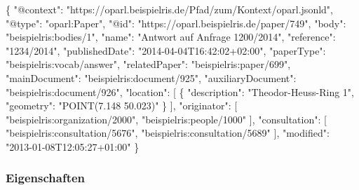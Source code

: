 \documentclass[,a4paper]{article}
\newenvironment{Shaded}{}{}
\newcommand{\DataTypeTok}[1]{\textcolor[rgb]{0.56,0.13,0.00}{{#1}}}
\newcommand{\StringTok}[1]{\textcolor[rgb]{0.25,0.44,0.63}{{#1}}}
\newcommand{\OtherTok}[1]{\textcolor[rgb]{0.00,0.44,0.13}{{#1}}}
\newcommand{\FunctionTok}[1]{\textcolor[rgb]{0.02,0.16,0.49}{{#1}}}
\begin{document}
\begin{Shaded}
\begin{Highlighting}[]
\FunctionTok{\{}
    \DataTypeTok{"@context"}\FunctionTok{:} \StringTok{"https://oparl.beispielris.de/Pfad/zum/Kontext/oparl.jsonld"}\FunctionTok{,}
    \DataTypeTok{"@type"}\FunctionTok{:} \StringTok{"oparl:Paper"}\FunctionTok{,}
    \DataTypeTok{"@id"}\FunctionTok{:} \StringTok{"https://oparl.beispielris.de/paper/749"}\FunctionTok{,}
    \DataTypeTok{"body"}\FunctionTok{:} \StringTok{"beispielris:bodies/1"}\FunctionTok{,}
    \DataTypeTok{"name"}\FunctionTok{:} \StringTok{"Antwort auf Anfrage 1200/2014"}\FunctionTok{,}
    \DataTypeTok{"reference"}\FunctionTok{:} \StringTok{"1234/2014"}\FunctionTok{,}
    \DataTypeTok{"publishedDate"}\FunctionTok{:} \StringTok{"2014-04-04T16:42:02+02:00"}\FunctionTok{,}
    \DataTypeTok{"paperType"}\FunctionTok{:} \StringTok{"beispielris:vocab/answer"}\FunctionTok{,}
    \DataTypeTok{"relatedPaper"}\FunctionTok{:} \StringTok{"beispielris:paper/699"}\FunctionTok{,}
    \DataTypeTok{"mainDocument"}\FunctionTok{:} \StringTok{"beispielris:document/925"}\FunctionTok{,}
    \DataTypeTok{"auxiliaryDocument"}\FunctionTok{:} \StringTok{"beispielris:document/926"}\FunctionTok{,}
    \DataTypeTok{"location"}\FunctionTok{:} \OtherTok{[}
        \FunctionTok{\{}
            \DataTypeTok{"description"}\FunctionTok{:} \StringTok{"Theodor-Heuss-Ring 1"}\FunctionTok{,}
            \DataTypeTok{"geometry"}\FunctionTok{:} \StringTok{"POINT(7.148  50.023)"}
        \FunctionTok{\}}
    \OtherTok{]}\FunctionTok{,}
    \DataTypeTok{"originator"}\FunctionTok{:} \OtherTok{[}
        \StringTok{"beispielris:organization/2000"}\OtherTok{,}
        \StringTok{"beispielris:people/1000"}
    \OtherTok{]}\FunctionTok{,}
    \DataTypeTok{"consultation"}\FunctionTok{:} \OtherTok{[}
        \StringTok{"beispielris:consultation/5676"}\OtherTok{,}
        \StringTok{"beispielris:consultation/5689"}
    \OtherTok{]}\FunctionTok{,}
    \DataTypeTok{"modified"}\FunctionTok{:} \StringTok{"2013-01-08T12:05:27+01:00"}
\FunctionTok{\}}
\end{Highlighting}
\end{Shaded}

\subsubsection{Eigenschaften}\label{eigenschaften-6}
\end{document}
